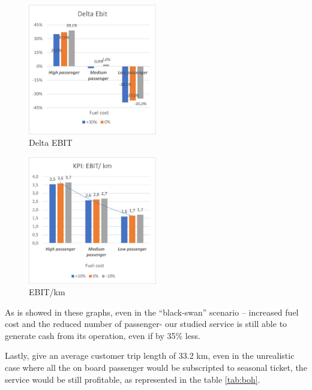 \begin{figure}[hp]
    \centering
    \includegraphics[width=0.5\textwidth]{Images/financial/ebitt.png}
    \caption{Delta EBIT}
    \label{fig:ebit}
\end{figure}
\begin{figure}[hp]
    \centering
    \includegraphics[width=0.5\textwidth]{Images/financial/ebitkm.png}
    \caption{EBIT/km}
    \label{fig:ebitkm}
\end{figure}
\newpage
As is showed in these graphs, even in the “black-swan” scenario – increased fuel cost and the reduced number of passenger- our studied service is still able to generate cash from its operation, even if by 35\% less.

Lastly, give an average customer trip length of 33.2 km, even in the unrealistic case where all the on board passenger would be subscripted to seasonal ticket, the service would be still profitable, as represented in the table \ref{tab:boh}.



